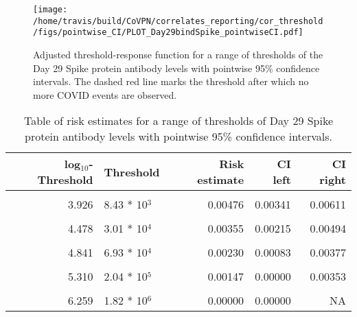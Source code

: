 \documentclass[]{book}
\theoremstyle{definition}
\theoremstyle{definition}
\theoremstyle{definition}
\newcommand{\1}{\mathbbm{1}}
\begin{document}
\begin{figure}[H]
\centering
\texttt{[image: /home/travis/build/CoVPN/correlates\_reporting/cor\_threshold/figs/pointwise\_CI/PLOT\_Day29bindSpike\_pointwiseCI.pdf]}
\caption{Adjusted threshold-response function for a range of thresholds of the
  Day 29 Spike protein antibody levels with pointwise 95\% confidence intervals. The dashed red line marks the threshold after which no more COVID events are observed. }
\end{figure}
\begin{table}[!h]

\caption{\label{tab:unnamed-chunk-355}Table of risk estimates for a range of thresholds of Day 29 Spike protein antibody levels with pointwise 95\% confidence intervals.}
\centering
\begin{tabular}[t]{rlrrr}
\toprule
log$_{10}$-Threshold & Threshold & Risk estimate & CI left & CI right\\
\midrule
\cellcolor{gray!6}{3.202} & \cellcolor{gray!6}{1.59 * 10$^3$} & \cellcolor{gray!6}{0.00567} & \cellcolor{gray!6}{0.00427} & \cellcolor{gray!6}{0.00707}\\
3.926 & 8.43 * 10$^3$ & 0.00476 & 0.00341 & 0.00611\\
\cellcolor{gray!6}{4.187} & \cellcolor{gray!6}{1.54 * 10$^4$} & \cellcolor{gray!6}{0.00460} & \cellcolor{gray!6}{0.00318} & \cellcolor{gray!6}{0.00602}\\
4.478 & 3.01 * 10$^4$ & 0.00355 & 0.00215 & 0.00494\\
\cellcolor{gray!6}{4.658} & \cellcolor{gray!6}{4.55 * 10$^4$} & \cellcolor{gray!6}{0.00278} & \cellcolor{gray!6}{0.00138} & \cellcolor{gray!6}{0.00419}\\
4.841 & 6.93 * 10$^4$ & 0.00230 & 0.00083 & 0.00377\\
\cellcolor{gray!6}{5.022} & \cellcolor{gray!6}{1.05 * 10$^5$} & \cellcolor{gray!6}{0.00182} & \cellcolor{gray!6}{0.00031} & \cellcolor{gray!6}{0.00332}\\
5.310 & 2.04 * 10$^5$ & 0.00147 & 0.00000 & 0.00353\\
\cellcolor{gray!6}{5.523} & \cellcolor{gray!6}{3.33 * 10$^5$} & \cellcolor{gray!6}{0.00132} & \cellcolor{gray!6}{0.00000} & \cellcolor{gray!6}{0.00393}\\
6.259 & 1.82 * 10$^6$ & 0.00000 & 0.00000 & NA\\
\bottomrule
\end{tabular}
\end{table}

\clearpage
\end{document}
